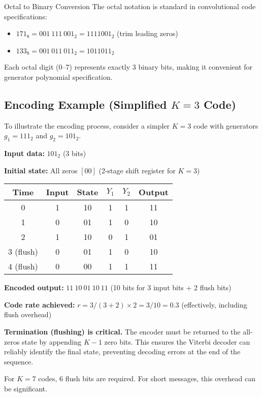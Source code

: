 \begin{calloutbox}{Octal to Binary Conversion}
The octal notation is standard in convolutional code specifications:
\begin{itemize}
\item $171_8 = 001\ 111\ 001_2 = 1111001_2$ (trim leading zeros)
\item $133_8 = 001\ 011\ 011_2 = 1011011_2$
\end{itemize}

Each octal digit (0--7) represents exactly 3 binary bits, making it convenient for generator polynomial specification.
\end{calloutbox}

\subsection{Encoding Example (Simplified $K=3$ Code)}

To illustrate the encoding process, consider a simpler $K=3$ code with generators $g_1 = 111_2$ and $g_2 = 101_2$.

\textbf{Input data:} $101_2$ (3 bits)

\textbf{Initial state:} All zeros $[00]$ (2-stage shift register for $K=3$)

\begin{center}
\begin{tabular}{@{}cccccc@{}}
\toprule
\textbf{Time} & \textbf{Input} & \textbf{State} & \textbf{$Y_1$} & \textbf{$Y_2$} & \textbf{Output} \\
\midrule
0 & 1 & 10 & 1 & 1 & 11 \\
1 & 0 & 01 & 1 & 0 & 10 \\
2 & 1 & 10 & 0 & 1 & 01 \\
3 (flush) & 0 & 01 & 1 & 0 & 10 \\
4 (flush) & 0 & 00 & 1 & 1 & 11 \\
\bottomrule
\end{tabular}
\end{center}

\textbf{Encoded output:} $11\ 10\ 01\ 10\ 11$ (10 bits for 3 input bits + 2 flush bits)

\textbf{Code rate achieved:} $r = 3/(3+2) \times 2 = 3/10 = 0.3$ (effectively, including flush overhead)

\begin{warningbox}
\textbf{Termination (flushing) is critical.} The encoder must be returned to the all-zeros state by appending $K-1$ zero bits. This ensures the Viterbi decoder can reliably identify the final state, preventing decoding errors at the end of the sequence.

For $K=7$ codes, 6 flush bits are required. For short messages, this overhead can be significant.
\end{warningbox}

